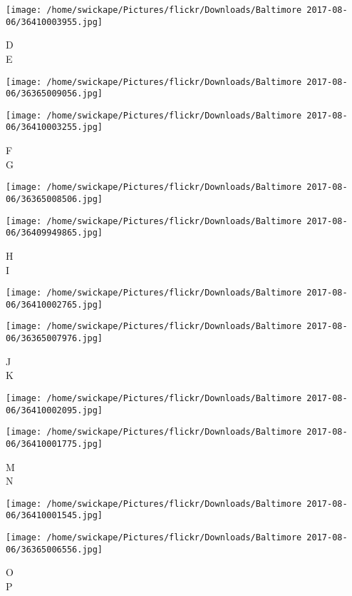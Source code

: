 \documentclass[10pt,letterpaper]{article}
\begin{document}
\vspace{0.25in}
\texttt{[image: /home/swickape/Pictures/flickr/Downloads/Baltimore 2017-08-06/36410003955.jpg]}

D\\
E
\pagebreak

\texttt{[image: /home/swickape/Pictures/flickr/Downloads/Baltimore 2017-08-06/36365009056.jpg]}

\vspace{0.25in}
\texttt{[image: /home/swickape/Pictures/flickr/Downloads/Baltimore 2017-08-06/36410003255.jpg]}

F\\
G
\pagebreak

\texttt{[image: /home/swickape/Pictures/flickr/Downloads/Baltimore 2017-08-06/36365008506.jpg]}

\vspace{0.25in}
\texttt{[image: /home/swickape/Pictures/flickr/Downloads/Baltimore 2017-08-06/36409949865.jpg]}

H\\
I
\pagebreak

\texttt{[image: /home/swickape/Pictures/flickr/Downloads/Baltimore 2017-08-06/36410002765.jpg]}

\vspace{0.25in}
\texttt{[image: /home/swickape/Pictures/flickr/Downloads/Baltimore 2017-08-06/36365007976.jpg]}

J\\
K
\pagebreak

\texttt{[image: /home/swickape/Pictures/flickr/Downloads/Baltimore 2017-08-06/36410002095.jpg]}

\vspace{0.25in}
\texttt{[image: /home/swickape/Pictures/flickr/Downloads/Baltimore 2017-08-06/36410001775.jpg]}

M\\
N
\pagebreak

\texttt{[image: /home/swickape/Pictures/flickr/Downloads/Baltimore 2017-08-06/36410001545.jpg]}

\vspace{0.25in}
\texttt{[image: /home/swickape/Pictures/flickr/Downloads/Baltimore 2017-08-06/36365006556.jpg]}

O\\
P
\pagebreak
\end{document}
